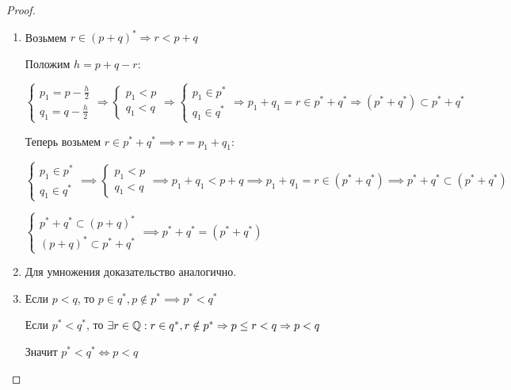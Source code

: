 \begin{proof}
    \begin{enumerate}
        \item Возьмем $r \in (p + q)^* \Rightarrow r < p + q$
        
        Положим $h = p + q - r$:
        
        $\begin{cases}
            p_1 = p - \frac{h}{2}\\
            q_1 = q - \frac{h}{2}
        \end{cases} \Rightarrow \begin{cases}
            p_1 < p\\
            q_1 < q
        \end{cases} \Rightarrow \begin{cases}
            p_1 \in p^*\\
            q_1 \in q^*
        \end{cases} \Rightarrow p_1 + q_1 = r \in p^* + q^* \Rightarrow (p^* + q^*) \subset p^* + q^*$

        Теперь возьмем $r \in p^* + q^* \implies r = p_1 + q_1$:

        $\begin{cases}
            p_1 \in p^*\\
            q_1 \in q^*
        \end{cases} \implies \begin{cases}
            p_1 < p\\
            q_1 < q
        \end{cases} \implies p_1 + q_1 < p + q \implies p_1 + q_1 = r \in (p^* + q^*) \implies p^* + q^* \subset (p^* + q^*)$

        $\begin{cases}
            p^* + q^* \subset (p + q)^*\\
            (p + q)^* \subset p^* + q^*
        \end{cases} \implies p^* + q^* = (p^* + q^*)$

        \item Для умножения доказательство аналогично.
        \item Если $p < q$, то $p \in q^*, p \notin p^* \implies p^* < q^*$
        
        Если $p^* < q^*$, то $\exists r \in \mathbb{Q}: r \in q^*, r \notin p^* \Rightarrow p \leq r < q \Rightarrow p < q$

        Значит $p^* < q^* \Leftrightarrow p < q$
    \end{enumerate}
\end{proof}

